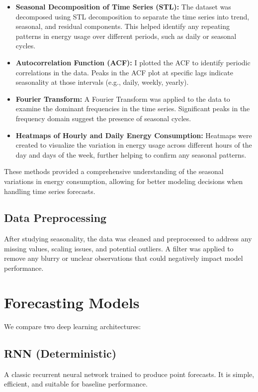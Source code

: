 \documentclass{article}
\begin{document}
\begin{itemize}
  \item \textbf{Seasonal Decomposition of Time Series (STL):} The dataset was decomposed using STL decomposition to separate the time series into trend, seasonal, and residual components. This helped identify any repeating patterns in energy usage over different periods, such as daily or seasonal cycles.
  \item \textbf{Autocorrelation Function (ACF):} I plotted the ACF to identify periodic correlations in the data. Peaks in the ACF plot at specific lags indicate seasonality at those intervals (e.g., daily, weekly, yearly).
  \item \textbf{Fourier Transform:} A Fourier Transform was applied to the data to examine the dominant frequencies in the time series. Significant peaks in the frequency domain suggest the presence of seasonal cycles.
  \item \textbf{Heatmaps of Hourly and Daily Energy Consumption:} Heatmaps were created to visualize the variation in energy usage across different hours of the day and days of the week, further helping to confirm any seasonal patterns.
\end{itemize}

These methods provided a comprehensive understanding of the seasonal variations in energy consumption, allowing for better modeling decisions when handling time series forecasts.

\subsection{Data Preprocessing}
After studying seasonality, the data was cleaned and preprocessed to address any missing values, scaling issues, and potential outliers. A filter was applied to remove any blurry or unclear observations that could negatively impact model performance.
\section{Forecasting Models}
We compare two deep learning architectures:

\subsection{RNN (Deterministic)}
A classic recurrent neural network trained to produce point forecasts. It is simple, efficient, and suitable for baseline performance.
\end{document}
